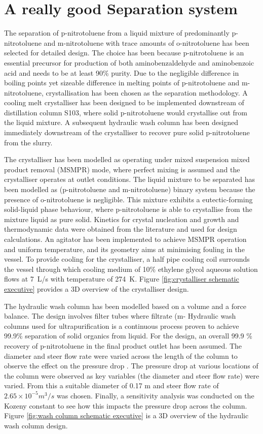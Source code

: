 \section*{A really good Separation system}

The separation of p-nitrotoluene from a liquid mixture of predominantly p-nitrotoluene and m-nitrotoluene with trace amounts of o-nitrotoluene has been selected for detailed design. The choice has been because p-nitrotoluene is an essential precursor for production of both aminobenzaldehyde and aminobenzoic acid and needs to be at least 90\% purity. Due to the negligible difference in boiling points yet sizeable difference in melting points of p-nitrotoluene and m-nitrotoluene, crystallisation has been chosen as the separation methodology. A cooling melt crystalliser has been designed to be implemented downstream of distillation column S103, where solid p-nitrotoluene would crystallise out from the liquid mixture. A subsequent hydraulic wash column has been designed immediately downstream of the crystalliser to recover pure solid p-nitrotoluene from the slurry. 


The crystalliser has been modelled as operating under mixed suspension mixed product removal (MSMPR) mode, where perfect mixing is assumed and the crystalliser operates at outlet conditions. The liquid mixture to be separated has been modelled as (p-nitrotoluene and m-nitrotoluene) binary system because the presence of o-nitrotoluene is negligible. This mixture exhibits a eutectic-forming solid-liquid phase behaviour, where p-nitrotoluene is able to crystallise from the mixture liquid as pure solid. Kinetics for crystal nucleation and growth and thermodynamic data were obtained from the literature and used for design calculations. An agitator has been implemented to achieve MSMPR operation and uniform temperature, and its geometry aims at minimising fouling in the vessel. To provide cooling for the crystalliser, a half pipe cooling coil surrounds the vessel through which cooling medium of 10\% ethylene glycol aqueous solution flows at \SI{7}{L/s} with temperature of \SI{274}{K}. Figure \ref{fig:crystalliser schematic executive} provides a 3D overview of the crystalliser design.


The hydraulic wash column has been modelled based on a volume and a force balance. The design involves filter tubes where filtrate (m- Hydraulic wash columns used for ultrapurification is a continuous process proven to achieve 99.9\% separation of solid organics from liquid. For the design, an overall 99.9 \% recovery of p-nitrotoluene in the final product outlet has been assumed. The diameter and steer flow rate were varied across the length of the column to observe the effect on the pressure drop . The pressure drop at various locations of the column were observed as key variables (the diameter and steer flow rate) were varied. From this a suitable diameter of 0.17 m and steer flow rate  of $2.65 \times 10^{-5} m^{3}/s$ was chosen. Finally, a sensitivity analysis was conducted on the Kozeny constant to see how this impacts the pressure drop across the column. Figure \ref{fig:wash column schematic executive} is a 3D overview of the hydraulic wash column design.


